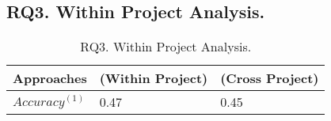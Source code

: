 \subsection{{\bf RQ3. Within Project Analysis.}}

\begin{table}[t]
	\caption{RQ3. Within Project Analysis.}
	\vspace{-0.1in}
	\begin{center}
		\footnotesize
		\tabcolsep 4pt
		\renewcommand{\arraystretch}{1} \begin{tabular}{p{1.4cm}<{\centering}|p{3cm}<{\centering}|p{3cm}<{\centering}}
			
			\hline
			Approaches          & \tool (Within Project) & \tool (Cross Project)\\
			\hline
			$Accuracy^{(1)}$   &      0.47          &		0.45	       \\

			\hline
		\end{tabular}
		\label{RQ3-result}
	\end{center}
\end{table}